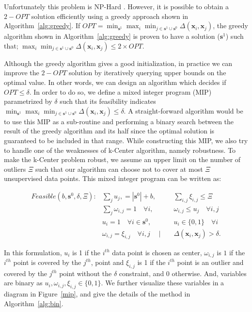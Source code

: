 \documentclass{article} %
\begin{document}
Unfortunately this problem is NP-Hard \citep{cook}. However, it is possible to obtain a $2-OPT$ solution efficiently
using a greedy approach shown in  Algorithm~\ref{alg:greedy}. If $OPT=\min_{\mathbf{s}^1} \max_i \min_{j \in
\mathbf{s}^1 \cup \mathbf{s}^0} \Delta(\mathbf{x}_i,\mathbf{x}_j)$, the greedy algorithm shown in
Algorithm~\ref{alg:greedy} is proven to have a solution ($\mathbf{s}^1$) such that; $ \max_i \min_{j \in \mathbf{s}^1
\cup \mathbf{s}^0} \Delta(\mathbf{x}_i,\mathbf{x}_j) \leq 2 \times OPT$.


Although the greedy algorithm gives a good initialization, in practice we can improve the $2-OPT$ solution by
iteratively querying upper bounds on the optimal value. In other words, we can design an algorithm which decides if $OPT
\leq \delta$. In order to do so, we define a mixed integer program (MIP) parametrized by $\delta$ such that its
feasibility indicates $\min_{\mathbf{s}^1} \max_i \min_{j \in \mathbf{s}^1 \cup \mathbf{s}^0}
\Delta(\mathbf{x}_i,\mathbf{x}_j) \leq \delta$. A straight-forward algorithm would be to use this MIP as a sub-routine and
performing a binary search between the result of the greedy algorithm and its half since the optimal solution is
guaranteed to be included in that range. While constructing this MIP, we also try to handle one of the weaknesses of
k-Center algorithm, namely robustness. To make the k-Center problem robust, we assume an upper limit on the number of
outliers $\Xi$ such that our algorithm can choose not to cover at most $\Xi$ unsupervised data points. This mixed
integer program can be written as:


\begin{equation} 
\begin{aligned}
Feasible(b,\mathbf{s}^0,\delta, \Xi):  &\sum_j  u_j, = |\mathbf{s}^0|+ b,  \quad &&  \sum_{i,j} \xi_{i,j} \leq \Xi \\
&\sum_j \omega_{i,j} = 1\quad \forall  i, \quad && \omega_{i,j} \leq u_j \quad \forall  i,j \\
   & u_i =1 \quad \forall i\in \mathbf{s}^0, \quad &&u_i \in \{0, 1\} \quad \forall i \\
   &\omega_{i,j} = \xi_{i,j} \quad  \forall i,j  \quad \mid&&    \Delta(\mathbf{x}_i,\mathbf{x}_j)  > \delta .
\end{aligned}
\label{eqmip}
\end{equation}

In this formulation, $u_i$ is 1 if the $i^{th}$ data point is chosen as center, $\omega_{i,j}$ is $1$ if the $i^{th}$
point is covered by the $j^{th}$, point and $\xi_{i,j}$ is 1 if the $i^{th}$ point is an outlier and covered by the
$j^{th}$ point without the $\delta$ constraint, and $0$ otherwise. And, variables are binary as $u_i, \omega_{i,j},
\xi_{i,j} \in \{0,1\}$. We further visualize these variables in a diagram in Figure~\ref{mip}, and give the details of
the method in Algorithm~\ref{alg:bin}. 
\end{document}
